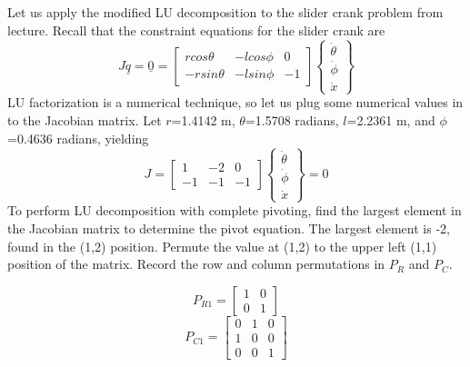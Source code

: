 \documentclass[12pt]{article}   %
\begin{document}
Let us apply the modified LU decomposition to the slider crank problem from lecture. Recall that the constraint equations for the slider crank are
\begin{equation}
J\underline{\dot{q}}=\underline{0}=\begin{bmatrix}
rcos\theta & -lcos\phi & 0\\
-rsin\theta & -lsin\phi & -1
\end{bmatrix}
\begin{Bmatrix}
\dot{\theta}\\
\dot{\phi}\\
\dot{x}
\end{Bmatrix}
\label{eq:slider_crank}
\end{equation}
LU factorization is a numerical technique, so let us plug some numerical values in to the Jacobian matrix. Let $r$=1.4142 m, $\theta$=1.5708 radians, $l$=2.2361 m, and $\phi$=0.4636 radians, yielding
\begin{equation}
J=\begin{bmatrix}
1 & -2 & 0\\
-1 & -1 & -1
\end{bmatrix}
\begin{Bmatrix}
\dot{\theta}\\
\dot{\phi}\\
\dot{x}
\end{Bmatrix}=0
\end{equation}
To perform LU decomposition with complete pivoting, find the largest element in the Jacobian matrix to determine the pivot equation. The largest element is -2, found in the (1,2) position. Permute the value at (1,2) to the upper left (1,1) position of the matrix. Record the row and column permutations in $P_R$ and $P_C$.

\begin{equation}
P_{R1} = \begin{bmatrix}
1 & 0 \\ 0 & 1
\end{bmatrix}
\end{equation}
\begin{equation}
P_{C1} = \begin{bmatrix}
0 & 1 & 0\\ 
1 & 0 & 0\\
0 & 0 & 1
\end{bmatrix}
\end{equation}
\end{document}
